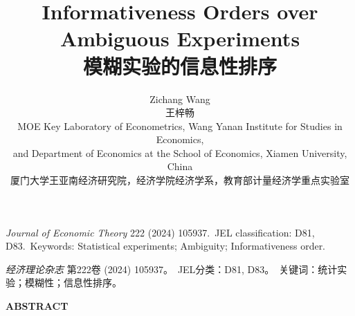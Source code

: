 \documentclass[12pt,a4paper]{article}
\newenvironment{original}
  {\par\vspace{4pt}\noindent\color{black}\ignorespaces}
  {\par\vspace{2pt}}
\newenvironment{translation}
  {\par\vspace{2pt}\noindent\color{myblue}\ignorespaces}
  {\par\vspace{6pt}}
\begin{document}

\title{\textbf{Informativeness Orders over Ambiguous Experiments}\\[4pt]
       {\color{myblue}\large 模糊实验的信息性排序}}
\author{Zichang Wang\\[4pt]
        {\color{myblue}王梓畅}\\[4pt]
        {\small MOE Key Laboratory of Econometrics, Wang Yanan Institute for Studies in Economics,}\\
        {\small and Department of Economics at the School of Economics, Xiamen University, China}\\[4pt]
        {\color{myblue}\small 厦门大学王亚南经济研究院，经济学院经济学系，教育部计量经济学重点实验室}}
\date{}

\maketitle


\vspace{-10pt}
\begin{original}
\textit{Journal of Economic Theory} 222 (2024) 105937.\
JEL classification: D81, D83.\
Keywords: Statistical experiments; Ambiguity; Informativeness order.
\end{original}

\begin{translation}
\textit{经济理论杂志} 第222卷 (2024) 105937。\
JEL分类：D81, D83。\
关键词：统计实验；模糊性；信息性排序。
\end{translation}

\bigskip

\begin{center}
\textbf{ABSTRACT}
\end{center}
\end{document}
